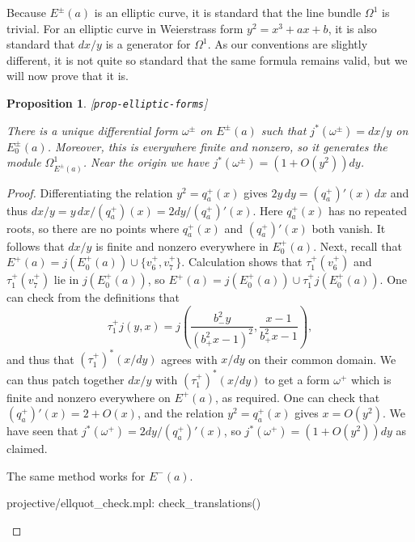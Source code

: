 \documentclass[reqno]{amsart}
\newcommand{\lbl}[1]{\label{#1}\textup{[\texttt{#1}]}\par}
\newcommand{\lbl}{\label}
\newcommand{\Om}        {\Omega}
\newcommand{\om}        {\omega}
\renewcommand{\:}{\colon}
\newtheorem{proposition}[theorem]{Proposition}
\theoremstyle{definition}
\begin{document}
Because $E^\pm(a)$ is an elliptic curve, it is standard that the line
bundle $\Om^1$ is trivial.  For an elliptic curve in Weierstrass form
$y^2=x^3+ax+b$, it is also standard that $dx/y$ is a generator for
$\Om^1$.  As our conventions are slightly different, it is not quite
so standard that the same formula remains valid, but we will now prove
that it is.

\begin{proposition}\lbl{prop-elliptic-forms}
 There is a unique differential form $\om^\pm$ on $E^\pm(a)$ such that
 $j^*(\om^\pm)=dx/y$ on $E_0^\pm(a)$.  Moreover, this is everywhere
 finite and nonzero, so it generates the module $\Om^1_{E^{\pm}(a)}$.
 Near the origin we have $j^*(\om^\pm)=(1+O(y^2))dy$.
\end{proposition}
\begin{proof}
 Differentiating the relation $y^2=q^+_a(x)$ gives $2y\,dy=(q^+_a)'(x)\,dx$
 and thus $dx/y=y\,dx/(q^+_a)(x)=2dy/(q^+_a)'(x)$.  Here $q_a^+(x)$ has no
 repeated roots, so there are no points where $q_a^+(x)$ and $(q_a^+)'(x)$
 both vanish.  It follows that $dx/y$ is finite and nonzero everywhere
 in $E^+_0(a)$.  Next, recall that
 $E^+(a)=j(E^+_0(a))\cup\{v_6^+,v_7^+\}$.  Calculation shows that
 $\tau^+_1(v^+_6)$ and $\tau^+_1(v^+_7)$ lie in $j(E^+_0(a))$, so
 $E^+(a)=j(E^+_0(a))\cup\tau^+_1j(E^+_0(a))$.  One can check from the
 definitions that
 \[ \tau^+_1j(y,x) = j\left(
     \frac{b_-^2y}{(b_+^2x-1)^2},
     \frac{x-1}{b_+^2x-1}
    \right),
 \]
 and thus that $(\tau^+_1)^*(x/dy)$ agrees with $x/dy$ on their common
 domain.  We can thus patch together $dx/y$ with $(\tau^+_1)^*(x/dy)$
 to get a form $\om^+$ which is finite and nonzero everywhere on
 $E^+(a)$, as required.  One can check that $(q_a^+)'(x)=2+O(x)$, and
 the relation $y^2=q^+_a(x)$ gives $x=O(y^2)$.  We have seen that
 $j^*(\om^+)=2dy/(q^+_a)'(x)$, so $j^*(\om^+)=(1+O(y^2))dy$ as claimed.

 The same method works for $E^-(a)$.
 \begin{checks}
  projective/ellquot_check.mpl: check_translations()
 \end{checks}
\end{proof}
\end{document}
